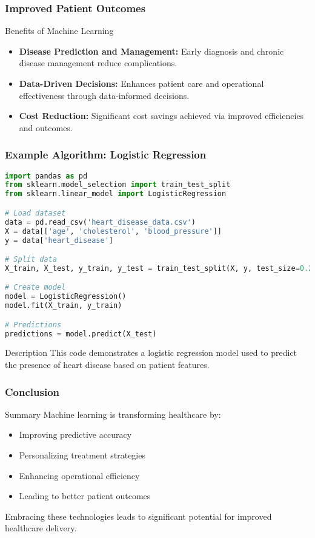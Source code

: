\documentclass{beamer}
\begin{document}
\begin{frame}[fragile]
    \frametitle{Improved Patient Outcomes}
    \begin{block}{Benefits of Machine Learning}
        \begin{itemize}
            \item \textbf{Disease Prediction and Management:} Early diagnosis and chronic disease management reduce complications.
            \item \textbf{Data-Driven Decisions:} Enhances patient care and operational effectiveness through data-informed decisions.
            \item \textbf{Cost Reduction:} Significant cost savings achieved via improved efficiencies and outcomes.
        \end{itemize}
    \end{block}
\end{frame}

\begin{frame}[fragile]
    \frametitle{Example Algorithm: Logistic Regression}
    \begin{lstlisting}[language=Python]
import pandas as pd
from sklearn.model_selection import train_test_split
from sklearn.linear_model import LogisticRegression

# Load dataset
data = pd.read_csv('heart_disease_data.csv')
X = data[['age', 'cholesterol', 'blood_pressure']]
y = data['heart_disease']

# Split data
X_train, X_test, y_train, y_test = train_test_split(X, y, test_size=0.2)

# Create model
model = LogisticRegression()
model.fit(X_train, y_train)

# Predictions
predictions = model.predict(X_test)
    \end{lstlisting}
    \begin{block}{Description}
        This code demonstrates a logistic regression model used to predict the presence of heart disease based on patient features.
    \end{block}
\end{frame}

\begin{frame}[fragile]
    \frametitle{Conclusion}
    \begin{block}{Summary}
        Machine learning is transforming healthcare by:
        \begin{itemize}
            \item Improving predictive accuracy
            \item Personalizing treatment strategies
            \item Enhancing operational efficiency
            \item Leading to better patient outcomes
        \end{itemize}
        Embracing these technologies leads to significant potential for improved healthcare delivery.
    \end{block}
\end{frame}
\end{document}
